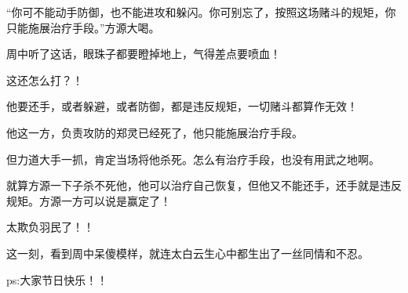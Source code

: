 \begin{this_body}
“你可不能动手防御，也不能进攻和躲闪。你可别忘了，按照这场赌斗的规矩，你只能施展治疗手段。”方源大喝。

周中听了这话，眼珠子都要瞪掉地上，气得差点要喷血！

这还怎么打？！

他要还手，或者躲避，或者防御，都是违反规矩，一切赌斗都算作无效！

他这一方，负责攻防的郑灵已经死了，他只能施展治疗手段。

但力道大手一抓，肯定当场将他杀死。怎么有治疗手段，也没有用武之地啊。

就算方源一下子杀不死他，他可以治疗自己恢复，但他又不能还手，还手就是违反规矩。方源一方可以说是赢定了！

太欺负羽民了！！

这一刻，看到周中呆傻模样，就连太白云生心中都生出了一丝同情和不忍。

ps:大家节日快乐！！

\end{this_body}

